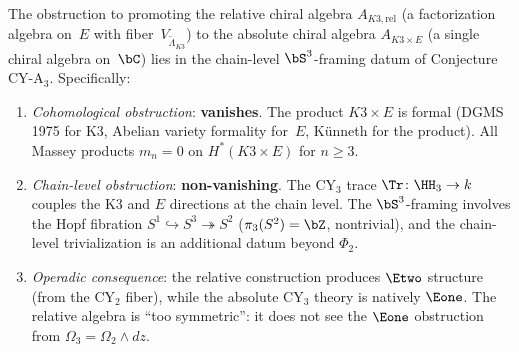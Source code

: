 \begin{proposition}
\label{prop:k3e-relative-obstruction-standalone}
\ClaimStatusProvedHere
The obstruction to promoting the relative chiral algebra
$A_{K3,\mathrm{rel}}$ (a factorization algebra on~$E$ with
fiber~$V_{\widetilde{\Lambda}_{K3}}$) to the absolute chiral algebra
$A_{K3 \times E}$ (a single chiral algebra on~$\bC$) lies in the
chain-level $\bS^3$-framing datum of Conjecture CY-A$_3$.
Specifically:
\begin{enumerate}[label=\textup{(\roman*)}]
 \item \emph{Cohomological obstruction}: \textbf{vanishes}.
  The product $K3 \times E$ is formal (DGMS 1975 for K3, Abelian
  variety formality for~$E$, K\"unneth for the product).  All Massey
  products $m_n = 0$ on $H^*(K3 \times E)$ for $n \geq 3$.
 \item \emph{Chain-level obstruction}: \textbf{non-vanishing}.
  The CY$_3$ trace $\Tr \colon \HH_3 \to k$ couples the K3 and $E$
  directions at the chain level.  The $\bS^3$-framing involves the
  Hopf fibration $S^1 \hookrightarrow S^3 \twoheadrightarrow S^2$
  ($\pi_3(S^2) = \bZ$, nontrivial), and the chain-level
  trivialization is an additional datum beyond $\Phi_2$.
 \item \emph{Operadic consequence}: the relative construction produces
  $\Etwo$ structure (from the CY$_2$ fiber), while the absolute
  CY$_3$ theory is natively $\Eone$.  The relative algebra is
  ``too symmetric'': it does not see the $\Eone$ obstruction from
  $\Omega_3 = \Omega_2 \wedge dz$.
\end{enumerate}
\end{proposition}

